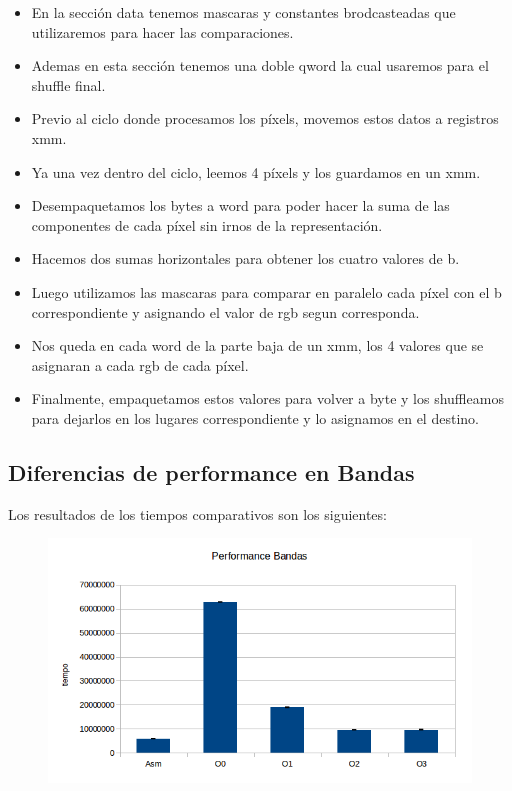 \documentclass[a4paper]{article}
\begin{document}
\begin{itemize}
\item  En la sección data tenemos mascaras y constantes brodcasteadas que utilizaremos para hacer las comparaciones.
\item  Ademas en esta sección tenemos una doble qword la cual usaremos para el shuffle final.
\item  Previo al ciclo donde procesamos los píxels, movemos estos datos a registros xmm.
\item  Ya una vez dentro del ciclo, leemos 4 píxels y los guardamos en un xmm.
\item  Desempaquetamos los bytes a word para poder hacer la suma de las componentes de cada píxel sin irnos de la representación.
\item  Hacemos dos sumas horizontales para obtener los cuatro valores  de b.
\item  Luego utilizamos las mascaras para comparar en paralelo cada píxel con el b correspondiente y asignando el valor de rgb segun corresponda.
\item  Nos queda en cada word de la parte baja de un xmm, los 4 valores que se asignaran a cada rgb de cada píxel.
\item  Finalmente, empaquetamos estos valores para volver a byte y los shuffleamos para dejarlos en los lugares correspondiente y lo asignamos en el destino.
\end{itemize}

\subsection{Diferencias de performance en Bandas}

Los resultados de los tiempos comparativos son los siguientes:

\newpage

\begin{figure}[h!]
  \begin{center}
  \includegraphics[scale=0.66]{Graficos1.4/ban/per.jpg}
  \label{nombreparareferenciar9}
  \end{center}
\end{figure}
\end{document}
